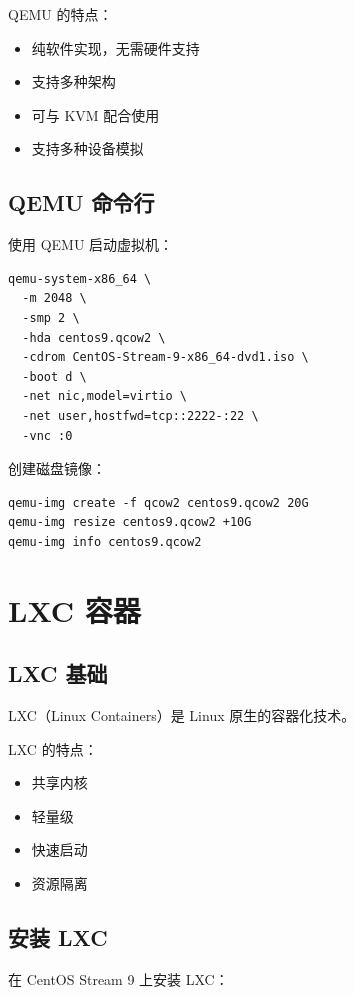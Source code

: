 \documentclass[12pt,UTF8]{ctexbook}
\begin{document}
QEMU 的特点：
\begin{itemize}
    \item 纯软件实现，无需硬件支持
    \item 支持多种架构
    \item 可与 KVM 配合使用
    \item 支持多种设备模拟
\end{itemize}

\section{QEMU 命令行}
\label{sec:qemu_command}

使用 QEMU 启动虚拟机：
\begin{verbatim}
qemu-system-x86_64 \
  -m 2048 \
  -smp 2 \
  -hda centos9.qcow2 \
  -cdrom CentOS-Stream-9-x86_64-dvd1.iso \
  -boot d \
  -net nic,model=virtio \
  -net user,hostfwd=tcp::2222-:22 \
  -vnc :0
\end{verbatim}

创建磁盘镜像：
\begin{verbatim}
qemu-img create -f qcow2 centos9.qcow2 20G
qemu-img resize centos9.qcow2 +10G
qemu-img info centos9.qcow2
\end{verbatim}

\chapter{LXC 容器}
\label{chap:lxc}

\section{LXC 基础}
\label{sec:lxc_basics}

LXC（Linux Containers）是 Linux 原生的容器化技术。

LXC 的特点：
\begin{itemize}
    \item 共享内核
    \item 轻量级
    \item 快速启动
    \item 资源隔离
\end{itemize}

\section{安装 LXC}
\label{sec:install_lxc}

在 CentOS Stream 9 上安装 LXC：
\end{document}
